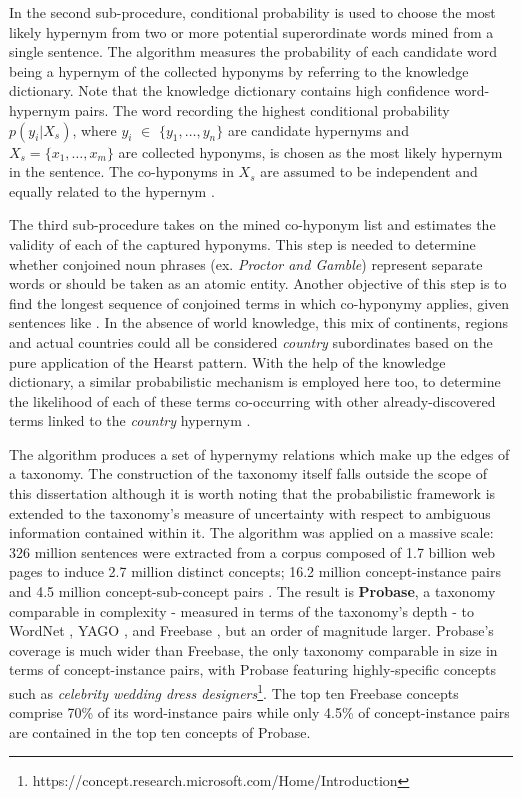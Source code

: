 In the second sub-procedure, conditional probability is used to choose the most likely hypernym from two or more potential superordinate words mined from a single sentence.  The algorithm measures the probability of each candidate word being a hypernym of the collected hyponyms by referring to the knowledge dictionary.  Note that the knowledge dictionary contains high confidence word-hypernym pairs.  The word recording the highest conditional probability $p(y_i | X_s)$, where $y_i$ $\in$ $\{y_1,\ldots,y_n\}$ are candidate hypernyms and $X_s=\{x_1,\ldots, x_m\}$ are collected hyponyms, is chosen as the most likely hypernym in the sentence.  The co-hyponyms in \(X_s\) are assumed to be independent and equally related to the hypernym \citep{wu2012probase}.

The third sub-procedure takes on the mined co-hyponym list and estimates the validity of each of the captured hyponyms.  This step is needed to determine whether conjoined noun phrases (ex. \textit{Proctor and Gamble}) represent separate words or should be taken as an atomic entity.  Another objective of this step is to find the longest sequence of conjoined terms in which co-hyponymy applies, given sentences like .  In the absence of world knowledge, this mix of continents, regions and actual countries could all be considered \textit{country} subordinates based on the pure application of the Hearst pattern.  With the help of the knowledge dictionary, a similar probabilistic mechanism is employed here too, to determine the likelihood of each of these terms co-occurring with other already-discovered terms linked to the \textit{country} hypernym \citep{wu2012probase}.  

The algorithm produces a set of hypernymy relations which make up the edges of a taxonomy.  The construction of the taxonomy itself falls outside the scope of this dissertation although it is worth noting that the probabilistic framework is extended to the taxonomy’s measure of uncertainty with respect to ambiguous information contained within it.  The algorithm was applied on a massive scale:  326 million sentences were extracted from a corpus composed of 1.7 billion web pages to induce 2.7 million distinct concepts; 16.2 million concept-instance pairs and 4.5 million concept-sub-concept pairs \citep{wu2012probase}.  The result is \textbf{Probase}, a taxonomy comparable in complexity  - measured in terms of the taxonomy’s depth - to WordNet \citep{Miller1995}, YAGO \citep{suchanek2007yago}, and Freebase \citep{bollacker2008freebase}, but an order of magnitude larger.  Probase’s coverage is much wider than Freebase, the only taxonomy comparable in size in terms of concept-instance pairs, with Probase featuring highly-specific concepts such as \textit{celebrity wedding dress designers}\footnote{https://concept.research.microsoft.com/Home/Introduction}.  The top ten Freebase concepts comprise 70\% of its word-instance pairs while only 4.5\% of concept-instance pairs are contained in the top ten concepts of Probase.

